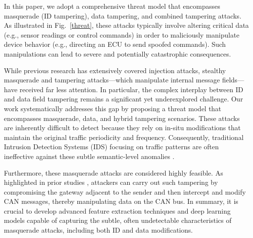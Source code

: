 \documentclass[lettersize,journal]{IEEEtran}
\begin{document}
In this paper, we adopt a comprehensive threat model that encompasses masquerade (ID tampering), data tampering, and combined tampering attacks. As illustrated in Fig.~\ref{threat}, these attacks typically involve altering critical data (e.g., sensor readings or control commands) in order to maliciously manipulate device behavior (e.g., directing an ECU to send spoofed commands). Such manipulations can lead to severe and potentially catastrophic consequences.

While previous research has extensively covered injection attacks, stealthy masquerade and tampering attacks—which manipulate internal message fields—have received far less attention. In particular, the complex interplay between ID and data field tampering remains a significant yet underexplored challenge. Our work systematically addresses this gap by proposing a threat model that encompasses masquerade, data, and hybrid tampering scenarios. These attacks are inherently difficult to detect because they rely on in-situ modifications that maintain the original traffic periodicity and frequency. Consequently, traditional Intrusion Detection Systems (IDS) focusing on traffic patterns are often ineffective against these subtle semantic-level anomalies \cite{b52}.

Furthermore, these masquerade attacks are considered highly feasible. As highlighted in prior studies \cite{b61}, attackers can carry out such tampering by compromising the gateway adjacent to the sender and then intercept and modify CAN messages, thereby manipulating data on the CAN bus. In summary, it is crucial to develop advanced feature extraction techniques and deep learning models capable of capturing the subtle, often undetectable characteristics of masquerade attacks, including both ID and data modifications.
\end{document}
